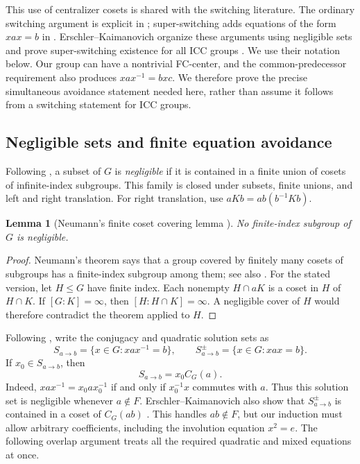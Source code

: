 \documentclass[11pt,letterpaper]{amsart}
\newtheorem{lemma}[theorem]{Lemma}
\theoremstyle{definition}
\theoremstyle{remark}
\begin{document}
This use of centralizer cosets is shared with the switching literature.
The ordinary switching argument is explicit in
\cite[Claim~3.3]{FTVF}; super-switching adds equations of the form
$xax=b$ in \cite[Definition~2.3 and Proposition~2.5]{FHTVF}.
Erschler--Kaimanovich organize these arguments using negligible sets
and prove super-switching existence for all ICC groups
\cite[Sections~4.B--4.C, especially Proposition~4.25]{EK}.
We use their notation below. Our group can have a nontrivial FC-center,
and the common-predecessor requirement also produces
$xax^{-1}=bxc$. We therefore prove the precise simultaneous avoidance
statement needed here, rather than assume it follows from a switching
statement for ICC groups.

\subsection{Negligible sets and finite equation avoidance}
Following \cite[Definition~4.9]{EK}, a subset of $G$ is
\emph{negligible} if it is contained in a finite union of cosets of
infinite-index subgroups. This family is closed under subsets, finite
unions, and left and right translation. For right translation, use
$aKb=ab(b^{-1}Kb)$.

\begin{lemma}[{Neumann's finite coset covering lemma \cite{Neumann}}]
\label{lem:coset-cover}
No finite-index subgroup of $G$ is negligible.
\end{lemma}
\begin{proof}
Neumann's theorem says that a group covered by finitely many cosets of
subgroups has a finite-index subgroup among them; see also
\cite[Lemma~4.13]{EK}. For the stated version, let $H\leq G$ have
finite index. Each nonempty $H\cap aK$ is a coset in $H$ of $H\cap K$.
If $[G:K]=\infty$, then $[H:H\cap K]=\infty$. A negligible cover of
$H$ would therefore contradict the theorem applied to $H$.
\end{proof}

Following \cite[\S\S4.B--4.C]{EK}, write the conjugacy and quadratic
solution sets as
\[
 S_{a\to b}=\{x\in G:xax^{-1}=b\},\qquad
 S^{\pm}_{a\to b}=\{x\in G:xax=b\}.
\]
If $x_0\in S_{a\to b}$, then
\begin{equation}\label{eq:solution-coset}
 S_{a\to b}=x_0C_G(a).
\end{equation}
Indeed, $xax^{-1}=x_0ax_0^{-1}$ if and only if $x_0^{-1}x$ commutes
with $a$. Thus this solution set is negligible whenever $a\notin F$.
Erschler--Kaimanovich also show that $S^{\pm}_{a\to b}$ is contained
in a coset of $C_G(ab)$ \cite[Lemma~4.23]{EK}. This handles $ab\notin F$,
but our induction must allow arbitrary coefficients, including the
involution equation $x^2=e$. The following overlap argument treats
all the required quadratic and mixed equations at once.
\end{document}
